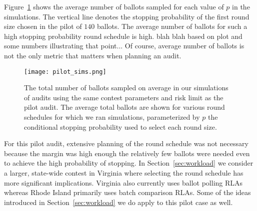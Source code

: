 Figure~\ref{fig:pilot_sims} shows the average number of ballots sampled for each value of $p$ in the simulations. The vertical line denotes the stopping probability of the first round size chosen in the pilot of $140$ ballots. The average number of ballots for such a high stopping probability round schedule is high. blah blah based on plot and some numbers illustrating that point... Of course, average number of ballots is not the only metric that matters when planning an audit. 


\begin{figure}
\texttt{[image: pilot\_sims.png]}
\caption{The total number of ballots sampled on average in our simulations of audits using the same contest parameters and risk limit as the pilot audit. The average total ballots are shown for various round schedules for which we ran simulations, parameterized by $p$ the conditional stopping probability used to select each round size.}
\label{fig:pilot_sims}
\end{figure}


For this pilot audit, extensive planning of the round schedule was not necessary because the margin was high enough the relatively few ballots were needed even to achieve the high probability of stopping. In Section~\ref{sec:workload} we consider a larger, state-wide contest in Virginia where selecting the round schedule has more significant implications. Virginia also currently uses ballot polling RLAs whereas Rhode Island primarily uses batch comparison RLAs. Some of the ideas introduced in Section~\ref{sec:workload} we do apply to this pilot case as well.

